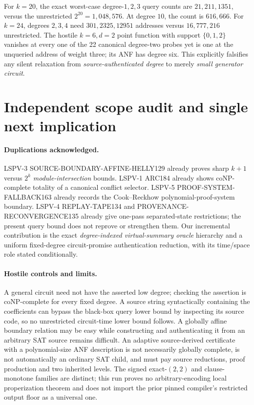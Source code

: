 \documentclass[11pt]{article}
\begin{document}
For $k=20$, the exact worst-case degree-$1,2,3$ query counts are $21,211,1351$, versus the unrestricted $2^{20}=1{,}048{,}576$. At degree $10$, the count is $616{,}666$. For $k=24$, degrees $2,3,4$ need $301,2325,12951$ addresses versus $16{,}777{,}216$ unrestricted. The hostile $k=6,d=2$ point function with support $\{0,1,2\}$ vanishes at every one of the 22 canonical degree-two probes yet is one at the unqueried address of weight three; its ANF has degree six. This explicitly falsifies any silent relaxation from \emph{source-authenticated degree} to merely \emph{small generator circuit}.

\section{Independent scope audit and single next implication}
\paragraph{Duplications acknowledged.} LSPV-3 SOURCE-BOUNDARY-AFFINE-HELLY129 already proves sharp $k+1$ versus $2^k$ \emph{module-intersection} bounds. LSPV-1 ARC184 already shows coNP-complete totality of a canonical conflict selector. LSPV-5 PROOF-SYSTEM-FALLBACK163 already records the Cook--Reckhow polynomial-proof-system boundary. LSPV-4 REPLAY-TAPE134 and PROVENANCE-RECONVERGENCE135 already give one-pass separated-state restrictions; the present query bound does not reprove or strengthen them. Our incremental contribution is the exact \emph{degree-indexed virtual-summary oracle} hierarchy and a uniform fixed-degree circuit-promise authentication reduction, with its time/space role stated conditionally.

\paragraph{Hostile controls and limits.} A general circuit need not have the asserted low degree; checking the assertion is coNP-complete for every fixed degree. A source string syntactically containing the coefficients can bypass the black-box query lower bound by inspecting its source code, so no unrestricted circuit-time lower bound follows. A globally affine boundary relation may be easy while constructing and authenticating it from an arbitrary SAT source remains difficult. An adaptive source-derived certificate with a polynomial-size ANF description is not necessarily globally complete, is not automatically an ordinary SAT child, and must pay source reductions, proof production and two inherited levels. The signed exact-$(2,2)$ and clause-monotone families are distinct; this run proves no arbitrary-encoding local properization theorem and does not import the prior pinned compiler's restricted output floor as a universal one.
\end{document}
